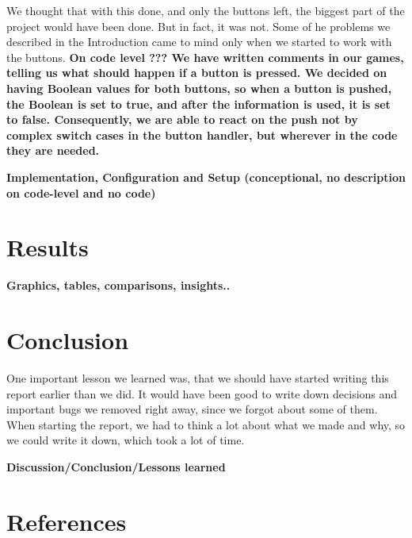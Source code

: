\documentclass[a4paper,12pt]{article}
\begin{document}
We thought that with this done, and only the buttons left, the biggest part of the project would have been done.
 But in fact, it was not.
 Some of he problems we described in the Introduction came to mind only when we started to work with the buttons.
 \textbf{ On code level ??? 
 We have written comments in our games, telling us what should happen if a button is pressed.
 We decided on having Boolean values for both buttons, so when a button is pushed, the Boolean is set to true, and after the information is used, it is set to false.
 Consequently, we are able to react on the push not by complex switch cases in the button handler, but wherever in the code they are needed.}
 
 
 
\textbf{Implementation, Configuration and Setup (conceptional, no description
on code-level and no code)}

\section{Results}
\textbf{Graphics, tables, comparisons, insights..}

\section{Conclusion}

One important lesson we learned was, that we should have started writing this report earlier than we did.
 It would have been good to write down decisions and important bugs we removed right away, since we forgot about some of them.
 When starting the report, we had to think a lot about what we made and why, so we could write it down, which took a lot of time.

\textbf{Discussion/Conclusion/Lessons learned}

\section{References}
\end{document}
